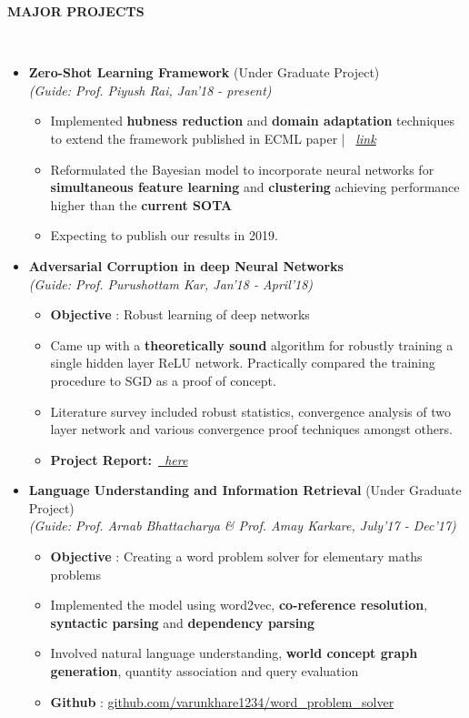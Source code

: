 \documentclass[a4paper,10pt]{article}
\newcommand{\isep}{-2 pt}
\newcommand{\lsep}{-0.5cm}
\newcommand{\resheading}[1]{{\small \colorbox{mygrey}{\begin{minipage}{0.975\textwidth}{\textbf{#1 \vphantom{p\^{E}}}}\end{minipage}}}}
\begin{document}
\resheading{\textbf{MAJOR PROJECTS} }\\[\lsep]

\begin{itemize}
\item \textbf{Zero-Shot Learning Framework} (Under Graduate Project)\\
 \emph{(Guide: Prof. Piyush Rai, Jan'18 - present)} \\[-0.6cm]
	\begin{itemize}\itemsep \isep
	\item Implemented \textbf{hubness reduction} and \textbf{domain adaptation} techniques to extend the  framework published in ECML paper | \faGlobe \ \href{https://arxiv.org/pdf/1711.05820.pdf}{\textit{link}} 
	\item Reformulated the Bayesian model to incorporate neural networks for \textbf{simultaneous feature learning} and \textbf{clustering} achieving performance higher than the  \textbf{current SOTA} 
    \item Expecting to publish our results in 2019.
	\end{itemize}
\item \textbf{Adversarial Corruption in deep Neural Networks} \\
 \emph{(Guide: Prof. Purushottam Kar, Jan'18 - April'18)} \\[-0.6cm]
	\begin{itemize}\itemsep \isep
	\item \textbf{Objective} : Robust learning of deep networks
	\item Came up with a \textbf{theoretically sound} algorithm for robustly training a single hidden layer ReLU network. Practically compared the training procedure to SGD as a proof of concept.
	\item Literature survey included robust statistics, convergence analysis of two layer network and various convergence proof techniques amongst others.
	\item \textbf{Project Report:}\ \href{http://home.iitk.ac.in/~varun/CS777.pdf}{\textit{\faGlobe \ here}}
	\end{itemize}
\item \textbf{Language Understanding and Information Retrieval} (Under Graduate Project) \\
 \emph{(Guide: Prof. Arnab Bhattacharya \& Prof. Amay Karkare, July'17 - Dec'17)} \\[-0.6cm]
	\begin{itemize}\itemsep \isep
	\item \textbf{Objective} : Creating a word problem solver for elementary maths problems
	\item Implemented the model using word2vec, \textbf{co-reference resolution}, \textbf{syntactic parsing} and \textbf{dependency parsing}
	\item Involved natural language understanding,\textbf{ world concept graph generation}, quantity association and query evaluation
	\item \textbf{Github} \faGithub  : \href{https://github.com/varunkhare1234/word_problem_solver }{github.com/varunkhare1234/word\_problem\_solver}
	\end{itemize}


\end{itemize}
\end{document}
